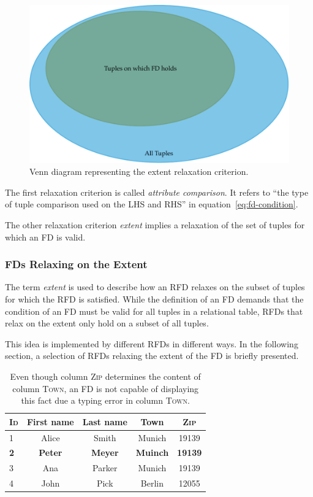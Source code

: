 \begin{figure}[ht]
     \centering
     \includegraphics[width=\textwidth]{images/rfds-extent.pdf}
     \caption{Venn diagram representing the extent relaxation criterion.}
     \label{fig:rfds-extent}
 \end{figure}

The first relaxation criterion is called \emph{attribute comparison}.
It refers to ``the type of tuple comparison used on the LHS and RHS'' in equation~\ref{eq:fd-condition}.

The other relaxation criterion \emph{extent} implies a relaxation of the set of tuples for which an FD is valid.

\subsubsection{FDs Relaxing on the Extent}
The term \emph{extent} is used to describe how an RFD relaxes on the subset of tuples for which the RFD is satisfied.
While the definition of an FD demands that the condition of an FD must be valid for all tuples in a relational table, RFDs that relax on the extent only hold on a subset of all tuples.

This idea is implemented by different RFDs in different ways.
In the following section, a selection of RFDs relaxing the extent of the FD is briefly presented.

\begin{table}[ht]
    \centering
    \begin{tabular}{lcccc}
        \toprule
        \toprule
        \textsc{Id} & First name & Last name & Town & \textsc{Zip} \\
        \midrule
        1 & Alice & Smith & Munich & 19139 \\
        \textbf{2} & \textbf{Peter}& \textbf{Meyer} &
        \textbf{Muinch} & \textbf{19139} \\
        3 & Ana & Parker & Munich & 19139  \\
        4 & John & Pick & Berlin & 12055 \\
        \bottomrule
        \bottomrule
    \end{tabular}
    \caption{Even though column \textsc{Zip} determines the content of column \textsc{Town}, an FD is not capable of displaying this fact due a typing error in column \textsc{Town}.}
    \label{tab:example-afd-necessity}
\end{table}

